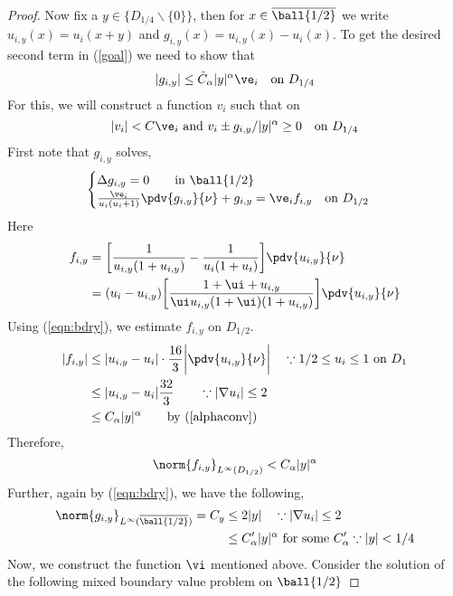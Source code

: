 \begin{proof}
Now fix a $y \in \{D_{1/4} \backslash \{0\} \}$, then for $x\in \overline{\ball {1/2}}$ we write $u_{i,y}(x)=u_i(x+y)$ and $g_{i,y}(x) = u_{i,y}(x)-u_i(x)$. To get the desired second term in (\ref{goal}) we need to show that  $$|g_{i,y}| \leq \tilde{C}_\alpha  |y|^{\alpha}\ve_i \quad \text{on } D_{1/4} $$
For this, we will construct a function $v_i$ such that on 
$$
    |v_i|<C\ve_i \text{ and } v_i \pm g_{i,y}/|y|^\alpha \geq 0 \quad \text{on }D_{1/4}
$$ 
First note that $g_{i,y}$ solves,
\begin{equation} \label{geqn}
    \begin{cases}
        \Delta g_{i,y} = 0 \qquad \text{in } \ball {1/2} \\
        \frac{\ve_i}{u_i(u_i+1)} \pdv{g_{i,y}}{\nu}+ g_{i,y} = \ve_i  f_{i,y} \quad \text{on } D_{1/2}
    \end{cases}
\end{equation}
Here 
\begin{align*}
    f_{i,y} &= \bigg [ \frac{1}{u_{i,y} (1+u_{i,y})}  -\frac{1}{u_i(1+u_i)} \bigg] \pdv{u_{i,y}}{\nu} \\
    &= (u_i-u_{i,y})\bigg  [ \frac{1+\ui+u_{i,y}}{\ui u_{i,y}(1+\ui)(1+u_{i,y})} \bigg] \pdv{u_{i,y}}{\nu}
\end{align*}  
Using (\ref{eqn:bdry}), we estimate $f_{i,y}$ on $D_{1/2}$. 
\begin{align*}
    |f_{i,y}| &\leq |u_{i,y}-u_i| \cdot \frac{16}{3} \bigg|\pdv{u_{i,y}}{\nu} \bigg| \quad \because 1/2 \leq u_i \leq 1 \text{ on } D_1  \\
    &\leq |u_{i,y}-u_i|  \frac{32}{3} \qquad \because |\nabla u_i| \leq 2 \\
    &\leq C_\alpha |y|^{\alpha} \qquad \text{by } (\ref{alphaconv})
\end{align*}
Therefore,
\begin{equation}\label{eqn:gfest}
    \norm{f_{i,y}}_{L^{\infty}(D_{1/2})} < C_{\alpha}|y|^\alpha  
\end{equation}
Further, again by (\ref{eqn:bdry}), we have the following,
\begin{align} \label{supest}
    \norm{g_{i,y}}_{L^{\infty}(\overline{\ball {1/2}})} =C_y &\leq 2|y| \quad \because |\nabla u_i| \leq 2  \\
    &\leq C'_{\alpha}|y|^{\alpha} \text{ for some }C'_\alpha \because |y|<1/4 \label{cprimeeqn}
\end{align}
Now, we construct the function $\vi$ mentioned above. Consider the solution of the following mixed boundary value problem on $\ball {1/2}$

\end{proof}

